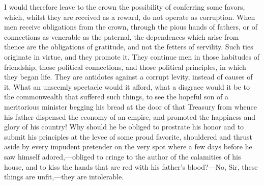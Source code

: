 I would therefore leave to the crown the possibility of conferring some favors, which, whilst they are received as a reward, do not operate as corruption. When men receive obligations from the crown, through the pious hands of fathers, or of connections as venerable as the paternal, the dependences which arise from thence are the obligations of gratitude, and not the fetters of servility. Such ties originate in virtue, and they promote it. They continue men in those habitudes of friendship, those political connections, and those political principles, in which they began life. They are antidotes against a corrupt levity, instead of causes of it. What an unseemly spectacle would it afford, what a disgrace would it be to the commonwealth that suffered such things, to see the hopeful son of a meritorious minister begging his bread at the door of that Treasury from whence his father dispensed the economy of an empire, and promoted the happiness and glory of his country! Why should he be obliged to prostrate his honor and to submit his principles at the levee of some proud favorite, shouldered and thrust aside by every impudent pretender on the very spot where a few days before he saw himself adored,—obliged to cringe to the author of the calamities of his house, and to kiss the hands that are red with his father's blood?—No, Sir, these things are unfit,—they are intolerable.

